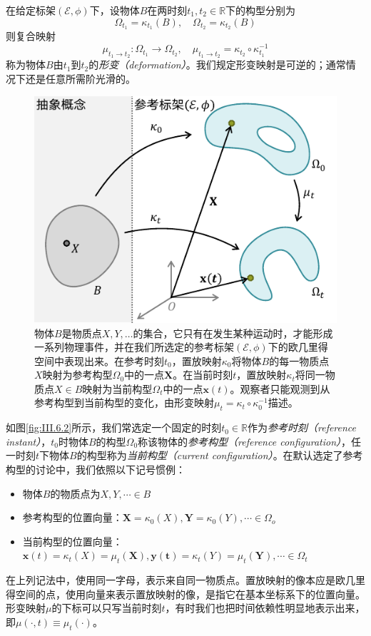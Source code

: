 \documentclass[main.tex]{subfiles}
\begin{document}
在给定标架$\left(\mathcal{E},\phi\right)$下，设物体$B$在两时刻$t_1,t_2\in\mathbb{R}$下的构型分别为
\[\Omega_{t_1}=\kappa_{t_1}\left(B\right),\quad\Omega_{t_2}=\kappa_{t_2}\left(B\right)\]
则复合映射
\[\mu_{t_1\to t_2}:\Omega_{t_1}\rightarrow\Omega_{t_2},\quad\mu_{t_1\to t_2}=\kappa_{t_2}\circ\kappa_{t_1}^{-1}\]
称为物体$B$由$t_1$到$t_2$的\emph{形变（deformation）}。我们规定形变映射是可逆的；通常情况下还是任意所需阶光滑的。

\begin{figure}[ht]
    \centering
    \includegraphics{images/III.6.1.pdf}
    \caption{物体$B$是物质点$X,Y,\dots$的集合，它只有在发生某种运动时，才能形成一系列物理事件，并在我们所选定的参考标架$\left(\mathcal{E},\phi\right)$下的欧几里得空间中表现出来。在参考时刻$t_0$，置放映射$\kappa_0$将物体$B$的每一物质点$X$映射为参考构型$\Omega_0$中的一点$\mathbf{X}$。在当前时刻$t$，置放映射$\kappa_t$将同一物质点$X\in B$映射为当前构型$\Omega_t$中的一点$\mathbf{x}\left(t\right)$。观察者只能观测到从参考构型到当前构型的变化，由形变映射$\mu_t=\kappa_t\circ\kappa_0^{-1}$描述。}
    \label{fig:III.6.1}
\end{figure}

如图\ref{fig:III.6.2}所示，我们常选定一个固定的时刻$t_0\in\mathbb{R}$作为\emph{参考时刻（reference instant）}，$t_0$时物体$B$的构型$\Omega_0$称该物体的\emph{参考构型（reference configuration）}，任一时刻$t$下物体$B$的构型称为\emph{当前构型（current configuration）}。在默认选定了参考构型的讨论中，我们依照以下记号惯例：
\begin{itemize}
    \item 物体$B$的物质点为$X,Y,\cdots\in B$
    \item 参考构型的位置向量：$\mathbf{X}=\kappa_0\left(X\right),\mathbf{Y}=\kappa_0\left(Y\right),\cdots\in\Omega_o$
    \item 当前构型的位置向量：$\mathbf{x}\left(t\right)=\kappa_t\left(X\right)=\mu_t\left(\mathbf{X}\right),\mathbf{y\left(t\right)}=\kappa_t\left(Y\right)=\mu_t\left(\mathbf{Y}\right),\cdots\in\Omega_t$
\end{itemize}
在上列记法中，使用同一字母，表示来自同一物质点。置放映射的像本应是欧几里得空间的点，使用向量来表示置放映射的像，是指它在基本坐标系下的位置向量。形变映射$\mu$的下标可以只写当前时刻$t$，有时我们也把时间依赖性明显地表示出来，即$\mu\left(\cdot,t\right)\equiv\mu_t\left(\cdot\right)$。
\end{document}
